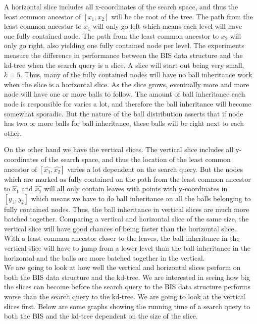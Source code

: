 A horizontal slice includes all x-coordinates of the search space, and thus the least common ancestor of $[x_1, x_2]$ will be the root of the tree. The path from the least common ancestor to $x_1$ will only go left which means each level will have one fully contained node. The path from the least common ancestor to $x_2$ will only go right, also yielding one fully contained node per level. The experiments measure the difference in performance between the BIS data structure and the kd-tree when the search query is a slice. A slice will start out being very small, $k=5$. Thus, many of the fully contained nodes will have no ball inheritance work when the slice is a horizontal slice. As the slice grows, eventually more and more node will have one or more balls to follow. The amount of ball inheritance each node is responsible for varies a lot, and therefore the ball inheritance will become somewhat sporadic. But the nature of the ball distribution asserts that if node has two or more balls for ball inheritance, these balls will be right next to each other.

On the other hand we have the vertical slices. The vertical slice includes all y-coordinates of the search space, and thus the location of the least common ancestor of $[\hat{x_1}, \hat{x_2}]$ varies a lot dependent on the search query. But the nodes which are marked as fully contained on the path from the least common ancestor to $\hat{x_1}$ and $\hat{x_2}$ will all only contain leaves with points with y-coordinates in $[y_1, y_2]$ which means we have to do ball inheritance on all the balls belonging to fully contained nodes. Thus, the ball inheritance in vertical slices are much more batched together. Comparing a vertical and horizontal slice of the same size, the vertical slice will have good chances of being faster than the horizontal slice. With a least common ancestor closer to the leaves, the ball inheritance in the vertical slice will have to jump from a lower level than the ball inheritance in the horizontal and the balls are more batched together in the vertical. \\

We are going to look at how well the vertical and horizontal slices perform on both the BIS data structure and the kd-tree. We are interested in seeing how big the slices can become before the search query to the BIS data structure performs worse than the search query to the kd-tree. We are going to look at the vertical slices first. Below are some graphs showing the running time of a search query to both the BIS and the kd-tree dependent on the size of the slice. 

